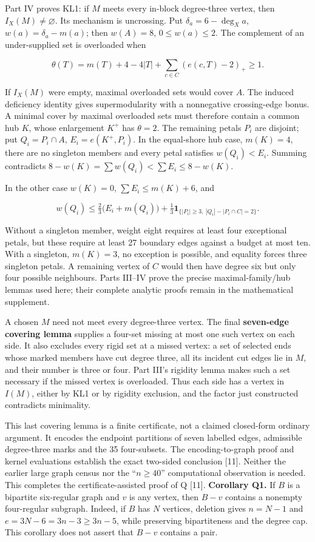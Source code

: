 \documentclass[
  11pt,
]{article}
\newcounter{none} %
\begin{document}
Part IV proves KL1: if \(M\) meets every in-block degree-three vertex,
then \(I_X(M)\ne\varnothing\). Its mechanism is uncrossing. Put
\(\delta_a=6-\deg_X a\), \(w(a)=\delta_a-m(a)\); then \(w(A)=8\),
\(0\le w(a)\le2\). The complement of an under-supplied set is overloaded
when

\[
\theta(T)=m(T)+4-4|T|+\sum_{c\in C}(e(c,T)-2)_+\ge1.
\]

If \(I_X(M)\) were empty, maximal overloaded sets would cover \(A\). The
induced deficiency identity gives supermodularity with a nonnegative
crossing-edge bonus. A minimal cover by maximal overloaded sets must
therefore contain a common hub \(K\), whose enlargement \(K^+\) has
\(\theta=2\). The remaining petals \(P_i\) are disjoint; put
\(Q_i=P_i\cap A\), \(E_i=e(K^+,P_i)\). In the equal-shore hub case,
\(m(K)=4\), there are no singleton members and every petal satisfies
\(w(Q_i)<E_i\). Summing contradicts
\(8-w(K)=\sum w(Q_i)<\sum E_i\le8-w(K)\).

In the other case \(w(K)=0\), \(\sum E_i\le m(K)+6\), and

\[
w(Q_i)\le\tfrac23\bigl(E_i+m(Q_i)\bigr)
+\tfrac13\mathbf1_{\{|P_i|\ge3,\ |Q_i|-|P_i\cap C|=2\}}.
\]

Without a singleton member, weight eight requires at least four
exceptional petals, but these require at least 27 boundary edges against
a budget at most ten. With a singleton, \(m(K)=3\), no exception is
possible, and equality forces three singleton petals. A remaining vertex
of \(C\) would then have degree six but only four possible neighbours.
Parts III--IV prove the precise maximal-family/hub lemmas used here;
their complete analytic proofs remain in the mathematical supplement.

A chosen \(M\) need not meet every degree-three vertex. The final
\textbf{seven-edge covering lemma} supplies a four-set missing at most
one such vertex on each side. It also excludes every rigid set at a
missed vertex: a set of selected ends whose marked members have cut
degree three, all its incident cut edges lie in \(M\), and their number
is three or four. Part III's rigidity lemma makes such a set necessary
if the missed vertex is overloaded. Thus each side has a vertex in
\(I(M)\), either by KL1 or by rigidity exclusion, and the factor just
constructed contradicts minimality.

This last covering lemma is a finite certificate, not a claimed
closed-form ordinary argument. It encodes the endpoint partitions of
seven labelled edges, admissible degree-three marks and the 35
four-subsets. The encoding-to-graph proof and kernel evaluations
establish the exact two-sided conclusion {[}11{]}. Neither the earlier
large graph census nor the ``\(n\ge40\)'' computational observation is
needed. This completes the certificate-assisted proof of Q {[}11{]}.
\textbf{Corollary Q1.} If \(B\) is a bipartite six-regular graph and
\(v\) is any vertex, then \(B-v\) contains a nonempty four-regular
subgraph. Indeed, if \(B\) has \(N\) vertices, deletion gives \(n=N-1\)
and \(e=3N-6=3n-3\geq3n-5\), while preserving bipartiteness and the
degree cap. This corollary does not assert that \(B-v\) contains a pair.
\end{document}
